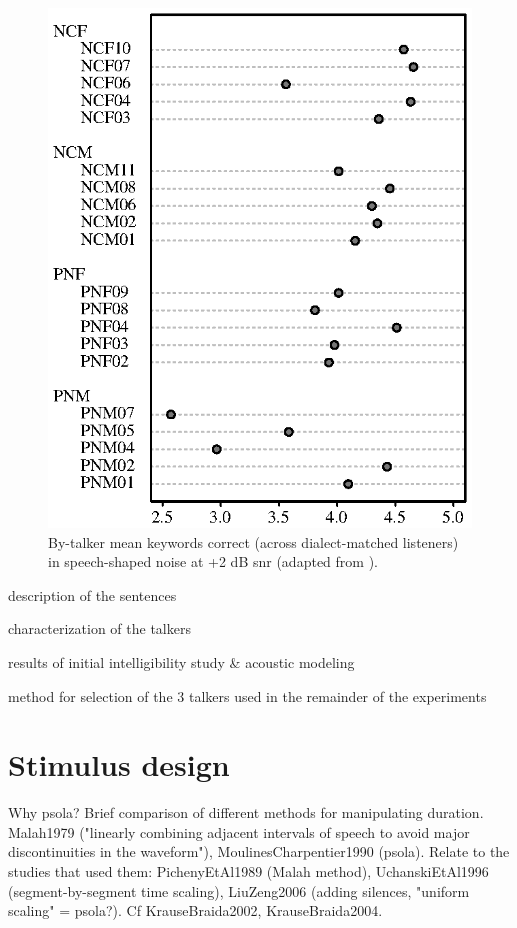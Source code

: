 \begin{figure}
	\begin{centering}
	\includegraphics{figures/dotchart.eps}
	\caption[Intelligibility of talkers used to make the stimuli]{By-talker mean keywords correct (across dialect-matched listeners) in speech-shaped noise at +2 dB \ac{snr} (adapted from \citet{McCloyEtAl2013}).\label{fig:dotchart}}
	\end{centering}
\end{figure}

\begin{itm}
	\item{description of the sentences}
	\item{characterization of the talkers}
	\item{results of initial intelligibility study \& acoustic modeling}
	\item{method for selection of the 3 talkers used in the remainder of the experiments}
\end{itm}


\section{Stimulus design\label{sec:StimDesign}}
Why \ac{psola}?  Brief comparison of different methods for manipulating duration.  Malah1979 ("linearly combining adjacent intervals of speech to avoid major discontinuities in the waveform"), MoulinesCharpentier1990 (\ac{psola}).  Relate to the studies that used them: PichenyEtAl1989 (Malah method), UchanskiEtAl1996 (segment-by-segment time scaling), LiuZeng2006 (adding silences, "uniform scaling" = \ac{psola}?).  Cf KrauseBraida2002, KrauseBraida2004.

